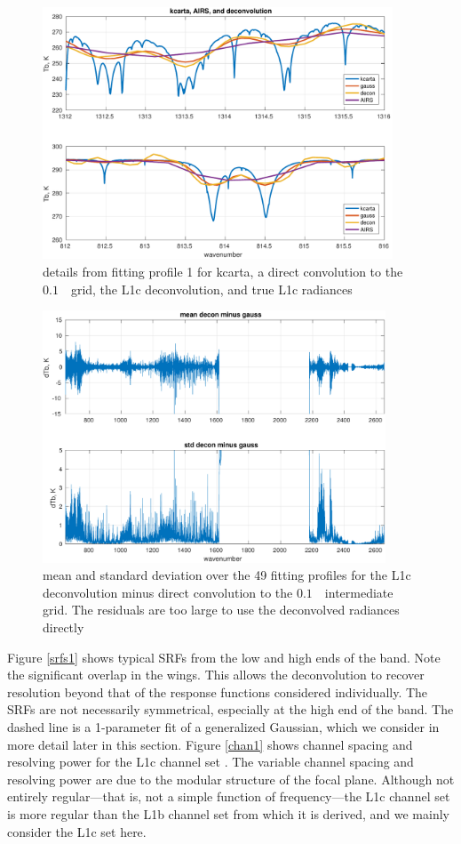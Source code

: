 \documentclass[11pt]{article}
\begin{document}
\begin{figure} %
  \centering
  \includegraphics[height=7.5cm]{figures/airs_decon_zoom.pdf}
  \caption{details from fitting profile 1 for kcarta, a direct
    convolution to the $0.1$~\wn\ grid, the L1c deconvolution, and
    true {\airs} L1c radiances}
  \label{dzoom}
\end{figure}

\begin{figure} %
  \centering
  \includegraphics[height=7.5cm]{figures/airs_decon_diff.pdf}
  \caption{mean and standard deviation over the 49 fitting profiles
    for the L1c deconvolution minus direct convolution to the
    $0.1$~\wn\ intermediate grid.  The residuals are too large to use
    the deconvolved radiances directly}
  \label{ddiff}
\end{figure}

Figure \ref{srfs1} shows typical {\airs} SRFs from the low and high
ends of the band.  Note the significant overlap in the wings.  This
allows the deconvolution to recover resolution beyond that of the
response functions considered individually.  The SRFs are not
necessarily symmetrical, especially at the high end of the band.
The dashed line is a 1-parameter fit of a generalized Gaussian,
which we consider in more detail later in this section.  Figure
\ref{chan1} shows channel spacing and resolving power for the
{\airs} L1c channel set \cite{airs1c}.  The variable channel spacing
and resolving power are due to the modular structure of the focal
plane.  Although not entirely regular---that is, not a simple
function of frequency---the L1c channel set is more regular than the
L1b channel set from which it is derived, and we mainly consider the
L1c set here.
\end{document}
